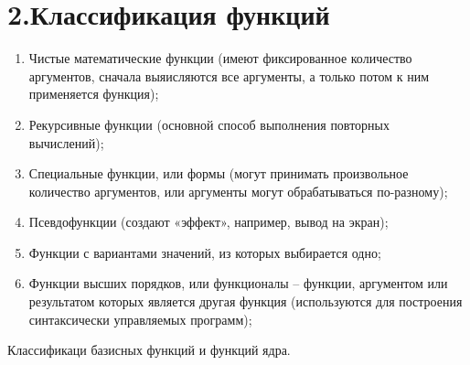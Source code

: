 \documentclass[12pt]{report}
\begin{document}
\section*{2.Классификация функций}


\begin{enumerate}
	\item Чистые  математические функции (имеют фиксированное количество аргументов, сначала выяисляются все аргументы, а только потом к ним применяется функция);
	\item Рекурсивные функции (основной способ выполнения повторных вычислений);
	\item Специальные функции, или формы (могут принимать произвольное количество аргументов, или аргументы могут обрабатываться по-разному);
	\item Псевдофункции (создают «эффект», например, вывод на экран);
	\item Функции с вариантами значений, из которых выбирается одно;
	\item Функции высших порядков, или функционалы --  функции, аргументом или  результатом которых является другая функция (используются для построения синтаксически управляемых программ);
\end{enumerate}

Классификаци базисных функций и функций ядра.
\end{document}
